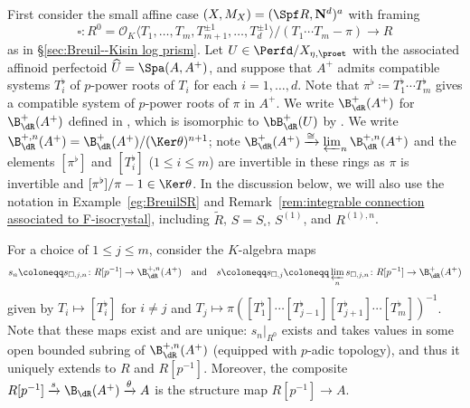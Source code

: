 \begin{construction}
First consider the small affine case $(X, M_X) = (\Spf R, \mathbf{N}^d)^a$ with framing 
\[
\square\colon R^0 = \mathcal{O}_K \langle T_1, \ldots, T_m, T_{m+1}^{\pm 1}, \ldots, T_d^{\pm 1}\rangle / (T_1\cdots T_m - \pi) \rightarrow R
\]
as in \S\ref{sec:Breuil--Kisin log prism}. 
Let $U\in \Perfd/X_{\eta,\proet}$ with the associated affinoid perfectoid $\widehat{U}=\Spa(A,A^+)$, and suppose that $A^{+}$ admits compatible systems $T_i^{\flat}$ of $p$-power roots of $T_i$ for each $i = 1, \ldots, d$. Note that $\pi^{\flat} \coloneqq T_1^\flat \cdots T_m^{\flat}$ gives a compatible system of $p$-power roots of $\pi$ in $A^{+}$. 
We write $\B_\dR^{+}(A^+)$ for $\B_\dR^+(A^+)$ defined in \cite[p.49]{scholze-p-adic-hodge}, which is isomorphic to $\bB_\dR^{+}(U)$ by \cite[Thm.~6.5(ii)]{scholze-p-adic-hodge}. We write $\B_\dR^{+,n}(A^+)=\B_\dR^+(A^+)/(\Ker\theta)^{n+1}$; note $\B_\dR^+(A^+)\xrightarrow{\cong}\varprojlim_n\B_\dR^{+,n}(A^+)$ and the elements $[\pi^\flat]$ and $[T_i^\flat]$ ($1\leq i\leq m$) are invertible in these rings as $\pi$ is invertible and $[\pi^\flat]/\pi-1\in \Ker\theta$. In the discussion below, we will also use the notation in Example~\ref{eg:BreuilSR} and Remark~\ref{rem:integrable connection associated to F-isocrystal}, including $\widetilde{R}$, $S=S_\square$, $S^{(1)}$, and $R^{(1),n}$.

For a choice of $1\leq j\leq m$, consider the $K$-algebra maps 
\[
s_n\coloneqq s_{\square,j,n}\colon R[p^{-1}]\rightarrow \B_\dR^{+,n}(A^+) \quad\text{and}\quad
s\coloneqq s_{\square,j}\coloneqq \varprojlim_n s_{\square,j,n}\colon R[p^{-1}]\rightarrow \B_\dR^{+}(A^+)
\]
given by $T_i \mapsto [T_i^{\flat}]$ for $i\neq j$ and $T_j\mapsto \pi([T_1^\flat]\cdots[T_{j-1}^\flat][T_{j+1}^\flat]\cdots [T_{m}^\flat])^{-1}$. Note that these maps exist and are unique: ${s_n}|_{R^0}$ exists and takes values in some open bounded subring of $\B_\dR^{+,n}(A^+)$ (equipped with $p$-adic topology), and thus it uniquely extends to $R$ and $R[p^{-1}]$. Moreover, the composite $R[p^{-1}] \xrightarrow{s} \B_{\dR}(A^+) \xrightarrow{\theta} A$ is the structure map $R[p^{-1}] \rightarrow A$.


\end{construction}
